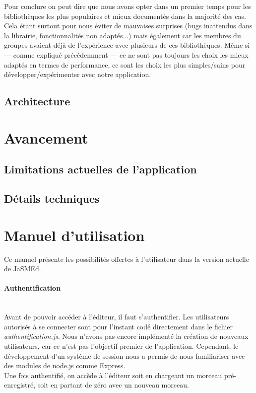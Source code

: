 \documentclass[12pt,a4paper]{article}
\begin{document}
\bigskip
Pour conclure on peut dire que nous avons opter dans un premier temps pour les bibliothèques les plus populaires et mieux documentés dans la majorité des cas. Cela étant surtout pour nous éviter de mauvaises surprises (bugs inattendus dans la librairie, fonctionnalités non adaptés...) mais également car les membres du groupes avaient déjà de l’expérience avec plusieurs de ces bibliothèques. Même si — comme expliqué précédemment — ce ne sont pas toujours les choix les mieux adaptés en termes de performance, ce sont les choix les plus simples/sains pour développer/expérimenter avec notre application.

\subsection{Architecture}


\section{Avancement}

\subsection{Limitations actuelles de l’application}

\subsection{Détails techniques}


\section{Manuel d'utilisation}

Ce manuel présente les possibilités offertes à l'utilisateur dans la version actuelle de JaSMEd.

\paragraph{Authentification}~\\
Avant de pouvoir accéder à l’éditeur, il faut s'authentifier. Les utilisateurs autorisés à se connecter sont pour l’instant codé directement dans le fichier \emph{authentification.js}. Nous n’avons pas encore implémenté la création de nouveaux utilisateurs, car ce n’est pas l’objectif premier de l’application. Cependant, le développement d’un système de session nous a permis de nous familiariser avec des modules de node.js comme Express.\\
Une fois authentifié, on accède à l’éditeur soit en chargeant un morceau pré-enregistré, soit en partant de zéro avec un nouveau morceau.
\end{document}
